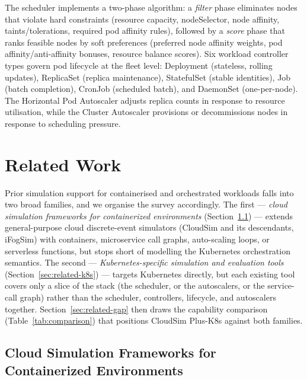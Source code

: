 \documentclass[ASNA,twocolumn]{USG}
\newcommand{\ckm}{CloudSim Plus-K8s\xspace}
\begin{document}
    The scheduler implements a two-phase algorithm: a \emph{filter} phase
    eliminates nodes that violate hard constraints (resource capacity,
    nodeSelector, node affinity, taints/tolerations, required pod affinity
    rules), followed by a \emph{score} phase that ranks feasible nodes by
    soft preferences (preferred node affinity weights, pod
    affinity/anti-affinity bonuses, resource balance scores). Six workload
    controller types govern pod lifecycle at the fleet level: Deployment
    (stateless, rolling updates), ReplicaSet (replica maintenance),
    StatefulSet (stable identities), Job (batch completion), CronJob
    (scheduled batch), and DaemonSet (one-per-node). The Horizontal Pod
    Autoscaler adjusts replica counts in response to resource utilisation,
    while the Cluster Autoscaler provisions or decommissions nodes in
    response to scheduling pressure.

    \section{Related Work}\label{sec:related}

    Prior simulation support for containerised and orchestrated workloads
    falls into two broad families, and we organise the survey accordingly.
    The first --- \emph{cloud simulation frameworks for containerized
    environments} (Section~\ref{sec:related-frameworks}) --- extends
    general-purpose cloud discrete-event simulators (CloudSim and its
    descendants, iFogSim) with containers, microservice call graphs,
    auto-scaling loops, or serverless functions, but stops short of
    modelling the Kubernetes orchestration semantics. The second ---
    \emph{Kubernetes-specific simulation and evaluation tools}
    (Section~\ref{sec:related-k8s}) --- targets Kubernetes directly, but
    each existing tool covers only a slice of the stack (the scheduler, or
    the autoscalers, or the service-call graph) rather than the scheduler,
    controllers, lifecycle, and autoscalers together.
    Section~\ref{sec:related-gap} then draws the capability comparison
    (Table~\ref{tab:comparison}) that positions \ckm against both families.

    \subsection{Cloud Simulation Frameworks for Containerized Environments}
    \label{sec:related-frameworks}
\end{document}
